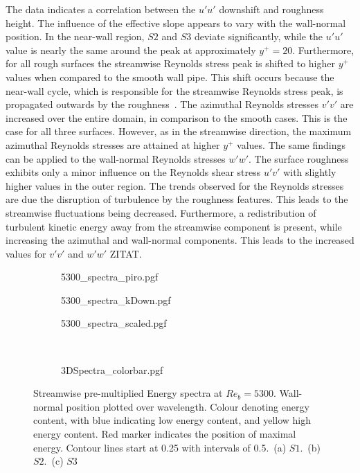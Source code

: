 The data indicates a correlation between the $u'u'$ downshift and roughness height. 
The influence of the effective slope appears to vary with the wall-normal position. 
In the near-wall region, $S2$ and $S3$ deviate significantly, while the $u'u'$ value is nearly the same around the peak at approximately $y^+ = 20$.
Furthermore, for all rough surfaces the streamwise Reynolds stress peak is shifted to higher $y^+$ values when compared to the smooth wall pipe.
This shift occurs because the near-wall cycle, which is responsible for the streamwise Reynolds stress peak, is propagated outwards by the roughness~\citep{macdonaldTurbulentFlowTransitionally2016}.
The azimuthal Reynolds stresses $v'v'$ are increased over the entire domain, in comparison to the smooth cases.
This is the case for all three surfaces.
However, as in the streamwise direction, the maximum azimuthal Reynolds stresses are attained at higher $y^+$ values.
The same findings can be applied to the wall-normal Reynolds stresses $w'w'$.
The surface roughness exhibits only a minor influence on the Reynolds shear stress $u'v'$ with slightly higher values in the outer region.
The trends observed for the Reynolds stresses are due the disruption of turbulence by the roughness features.
This leads to the streamwise fluctuations being decreased.
Furthermore, a redistribution of turbulent kinetic energy away from the streamwise component is present, while increasing the azimuthal and wall-normal components.
This leads to the increased values for $v'v'$ and $w'w'$ ZITAT.

\begin{figure}
    \centering
    \begin{subfigure}{0.495\textwidth}
    \subcaption{}
        {5300_spectra_piro.pgf}
    \end{subfigure}
    \hfill
    \begin{subfigure}{0.495\textwidth}
        \subcaption{}
        {5300_spectra_kDown.pgf}
    \end{subfigure}
    \centering
    \begin{subfigure}{0.495\textwidth}
        \subcaption{}
        {5300_spectra_scaled.pgf}
    \end{subfigure}
    \centering
    \\[5pt]
    \begin{subfigure}{\textwidth}
        \centering
        \hspace{0.9cm}
        {3DSpectra_colorbar.pgf}
    \end{subfigure}
    \caption[Streamwise energy spectra at $Re_b = 5300$]{Streamwise pre-multiplied Energy spectra at $Re_b = 5300$. Wall-normal position plotted over wavelength. Colour denoting energy content, with blue indicating low energy content, and yellow high energy content. Red marker indicates the position of maximal energy. Contour lines start at 0.25 with intervals of 0.5.~(a) $S1$.~(b) $S2$.~(c) $S3$}
    \label{fig: Reb5300 energy spectra}
\end{figure}

